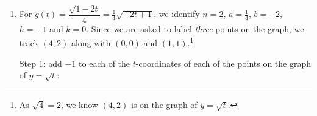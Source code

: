 \documentclass{ximera}
\begin{document}
\begin{example}
\begin{enumerate}
\[\begin{array}[v]{rlc}
\begin{tikzpicture}
\begin{axis}[
  xmin=-7, xmax=1,
  ymin=-6, ymax=6,
  axis lines=middle,
  axis line style={->},
  ticks=none,
  clip=false
]
\addplot+[domain=-1.587:1.587, samples=200, smooth, line width=1.25pt, <->, variable=\t, parametric]
  ({\t^3-3},{-2*\t});

\addplot+[only marks, mark=*, mark size=2pt] coordinates {(-2,-2) (-3,0) (-4,2)};

\node at (rel axis cs:0.5,-0.12){\scriptsize $y=-2\sqrt[3]{x+3}$};
\end{axis}
\end{tikzpicture}


&
\stackrel{\text{ \scriptsize  add $1$ to each $y$-value}}{\xrightarrow{\hspace{1.5in}}}
&

% 
\begin{tikzpicture}
\begin{axis}[
  xmin=-7, xmax=1,
  ymin=-5, ymax=7,
  axis lines=middle,
  axis line style={->},
  ticks=none,
  clip=false
]
\node at (axis cs:1,-0.5){\scriptsize $x$};
\node at (axis cs:0.5,7){\scriptsize $y$};
\node at (axis cs:-2,-3){\scriptsize $(-2,-1)$};
\node at (axis cs:-4,1){\scriptsize $(-3,1)$};
\node at (axis cs:-4,4.5){\scriptsize $(-4,1)$};

\addplot+[domain=-1.587:1.587, samples=200, smooth, line width=1.25pt, <->, variable=\t, parametric]
  ({\t^3-3},{1-2*\t});

\addplot+[only marks, mark=*, mark size=2pt] coordinates {(-2,-1) (-3,1) (-4,3)};

\node at (rel axis cs:0.5,-0.12){\scriptsize $y=-2\sqrt[3]{x+3}+1$};
\end{axis}
\end{tikzpicture}
\\

\text{\scriptsize  $(-4,2)$, $(-3,0)$, $(-2,-2)$}  & &\text{\scriptsize  $(-4,3)$, $(-3,1)$, $(-2,-1)$}  \\
 
 \end{array} \]
 
 We get the domain and range of $f$ are $(-\infty, \infty)$.
 
 \item  For $g(t) = \dfrac{\sqrt{1-2t}}{4} = \frac{1}{4} \sqrt{-2t+1}$, we identify $n=2$, $a = \frac{1}{4}$, $b = -2$, $h = -1$ and $k =0$.  Since we are asked to label \textit{three} points on the graph, we track $(4,2)$ along with $(0,0)$ and $(1,1)$.\footnote{As $\sqrt{4} = 2$, we know $(4,2)$ is on the graph of $y = \sqrt{t}$.}


Step 1:   add $-1$ to each of the $t$-coordinates of each of the points on the graph of $y=\sqrt{t}$:


\end{enumerate}
\end{example}
\end{document}
